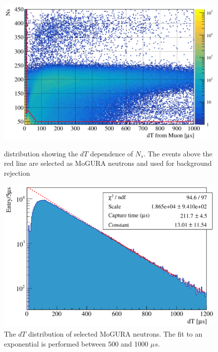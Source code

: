 \begin{figure}[htb]
    \begin{minipage}{0.5\textwidth}
        \centering
        \includegraphics[scale=0.3]{mog_neutron.png}
        \caption{distribution showing the $dT$ dependence of $N_s$. The events above the red line are selected as MoGURA neutrons and used for background rejection \cite{takeuchi_phd}}
        \label{fig:neutron_selection}
    \end{minipage}
    \hfill
    \begin{minipage}{0.5\textwidth}
        \centering
        \includegraphics[scale=0.3]{mog_neutron_dt.png}
        \caption{The $dT$ distribution of selected MoGURA neutrons. The fit to an exponential is performed between 500 and 1000 $\mu s$. \cite{takeuchi_phd}}
        \label{fig:neutron_dT}
    \end{minipage}
\end{figure}

